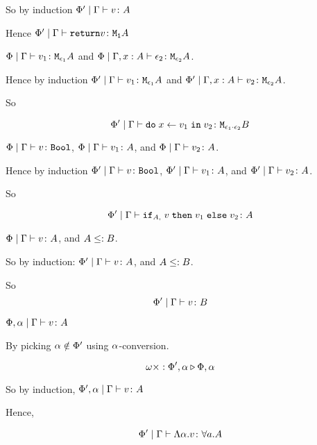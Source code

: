 {    So by induction $\Phi'\mid\Gamma \vdash v \colon A$

    Hence $\Phi'\mid\Gamma \vdash \texttt{return} v \colon \texttt{M}_{\texttt{1}}{A}$


    \bi $\Phi\mid\Gamma \vdash v_1 \colon \texttt{M}_{\epsilon_1}{A}$ and $\Phi\mid\Gamma, x: A \vdash \epsilon_2 \colon \texttt{M}_{\epsilon_2}{A}$.

    Hence by induction $\Phi'\mid\Gamma \vdash v_1 \colon \texttt{M}_{\epsilon_1}{A}$ and $\Phi'\mid\Gamma, x: A \vdash v_2 \colon \texttt{M}_{\epsilon_2}{A}$.

    So

    \begin{equation}
        \Phi'\mid\Gamma \vdash \texttt{do}\; x \leftarrow v_1 \;\texttt{in}\; v_2 \colon \texttt{M}_{\epsilon_1\cdot\epsilon_2}{B}
    \end{equation}


    \bi $\Phi\mid\Gamma \vdash v \colon \texttt{Bool}$, $\Phi\mid\Gamma \vdash v_1 \colon A$, and $\Phi\mid\Gamma \vdash v_2 \colon A$.

    Hence by induction
    $\Phi'\mid\Gamma \vdash v \colon \texttt{Bool}$, $\Phi'\mid\Gamma \vdash v_1 \colon A$, and $\Phi'\mid\Gamma \vdash v_2 \colon A$.

    So 

    \begin{equation}
        \Phi'\mid\Gamma \vdash \texttt{if}_{A, }\; v\; \texttt{then}\; v_1 \;\texttt{else} \; v_2 \colon A
    \end{equation}

    \bi $\Phi\mid\Gamma \vdash v \colon A$, and $A\leq: B$.

    So by induction:
    $\Phi'\mid\Gamma \vdash v \colon A$, and $A\leq: B$.

    So \begin{equation}
        \Phi'\mid\Gamma \vdash v \colon B
    \end{equation}

    \bi $\Phi, \alpha\mid\Gamma \vdash v \colon A$

    By picking $\alpha\notin\Phi'$ using $\alpha$-conversion.

    \begin{equation}
        \omega\times : \Phi',\alpha \triangleright \Phi,\alpha
    \end{equation}

    So by induction, $\Phi', \alpha\mid\Gamma \vdash v \colon A$

    Hence,

    \begin{equation}
        \Phi'\mid\Gamma \vdash \Lambda \alpha. v \colon \forall a. A
    \end{equation}


}
